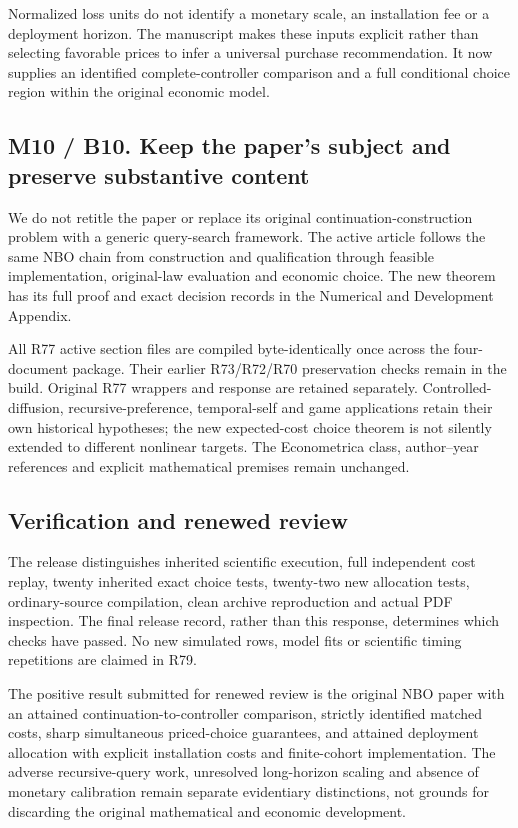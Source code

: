 \documentclass[ecta,nameyear,draft]{econsocart}
\begin{document}
Normalized loss units do not identify a monetary scale, an installation
fee or a deployment horizon. The manuscript makes these inputs explicit
rather than selecting favorable prices to infer a universal purchase
recommendation. It now supplies an identified complete-controller
comparison and a full conditional choice region within the original
economic model.

\hypertarget{m10-b10.-keep-the-papers-subject-and-preserve-substantive-content}{%
\subsection{M10 / B10. Keep the paper's subject and preserve substantive
content}\label{m10-b10.-keep-the-papers-subject-and-preserve-substantive-content}}

We do not retitle the paper or replace its original
continuation-construction problem with a generic query-search framework.
The active article follows the same NBO chain from construction and
qualification through feasible implementation, original-law evaluation
and economic choice. The new theorem has its full proof and exact
decision records in the Numerical and Development Appendix.

All R77 active section files are compiled byte-identically once across
the four-document package. Their earlier R73/R72/R70 preservation checks
remain in the build. Original R77 wrappers and response are retained
separately. Controlled-diffusion, recursive-preference, temporal-self
and game applications retain their own historical hypotheses; the new
expected-cost choice theorem is not silently extended to different
nonlinear targets. The Econometrica class, author--year references and
explicit mathematical premises remain unchanged.

\hypertarget{verification-and-renewed-review}{%
\subsection{Verification and renewed
review}\label{verification-and-renewed-review}}

The release distinguishes inherited scientific execution, full
independent cost replay, twenty inherited exact choice tests, twenty-two
new allocation tests, ordinary-source compilation, clean archive
reproduction and actual PDF inspection. The final release record, rather
than this response, determines which checks have passed. No new
simulated rows, model fits or scientific timing repetitions are claimed
in R79.

The positive result submitted for renewed review is the original NBO
paper with an attained continuation-to-controller comparison, strictly
identified matched costs, sharp simultaneous priced-choice guarantees,
and attained deployment allocation with explicit installation costs and
finite-cohort implementation. The adverse recursive-query work,
unresolved long-horizon scaling and absence of monetary calibration
remain separate evidentiary distinctions, not grounds for discarding the
original mathematical and economic development.
\end{document}

